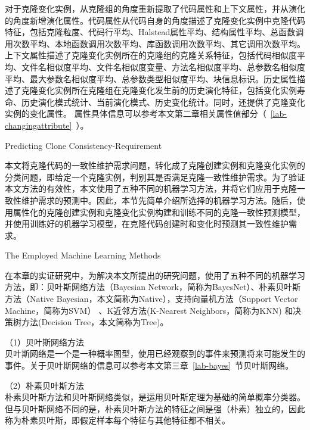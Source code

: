 对于克隆变化实例，从克隆组的角度重新提取了代码属性和上下文属性，并从演化的角度新增演化属性。代码属性从代码自身的角度描述了克隆变化实例中克隆代码特征，包括克隆粒度、代码行平均、Halstead属性平均、结构属性平均、总函数调用次数平均、本地函数调用次数平均、库函数调用次数平均、其它调用次数平均。上下文属性描述了克隆变化实例所在的克隆组的克隆关系特征，包括代码相似度平均、文件名相似度平均、文件名相似度变量、方法名相似度平均、总参数名相似度平均、最大参数名相似度平均、总参数类型相似度平均、块信息标识。历史属性描述了克隆变化实例所在克隆组在克隆变化发生前的历史演化特征，包括变化实例寿命、历史演化模式统计、当前演化模式、历史变化统计。同时，还提供了克隆变化实例的变化属性。
属性具体信息可以参考本文第二章相关属性值部分（~\ref{lab-changingattribute}~）。


{Predicting Clone Consistency-Requirement}

本文将克隆代码的一致性维护需求问题，转化成了克隆创建实例和克隆变化实例的分类问题，即给定一个克隆实例，判别其是否满足克隆一致性维护需求。为了验证本文方法的有效性，本文使用了五种不同的机器学习方法，并将它们应用于克隆一致性维护需求的预测中。因此，本节先简单介绍所选择的机器学习方法。随后，使用属性化的克隆创建实例和克隆变化实例构建和训练不同的克隆一致性预测模型，并使用训练好的机器学习模型，在克隆代码创建时和变化时预测其一致性维护需求。

{The Employed Machine Learning Methods}

在本章的实证研究中，为解决本文所提出的研究问题，使用了五种不同的机器学习方法，即：贝叶斯网络方法（Bayesian Network，简称为BayesNet）\cite{friedman1997bayesian}、朴素贝叶斯方法（Native Bayesian，本文简称为Native）\cite{john1995estimating}，支持向量机方法（Support Vector Machine，简称为SVM）\cite{platt199912} 、K近邻方法(K-Nearest Neighbors，简称为KNN) \cite{aha1991instance}和决策树方法(Decision Tree，本文简称为Tree)\cite{quinlan2014c4}。

（1）贝叶斯网络方法\\
贝叶斯网络是一个是一种概率图型，使用已经观察到的事件来预测将来可能发生的事件\cite{friedman1997bayesian}。关于贝叶斯网络的信息可以参考本文第三章~\ref{lab-bayes}~节贝叶斯网络。

（2）朴素贝叶斯方法\\
朴素贝叶斯方法和贝叶斯网络类似，是运用贝叶斯定理为基础的简单概率分类器。但与贝叶斯网络不同的是，朴素贝叶斯方法的特征之间是强（朴素）独立的，因此称为朴素贝叶斯，即假定样本每个特征与其他特征都不相关。 

